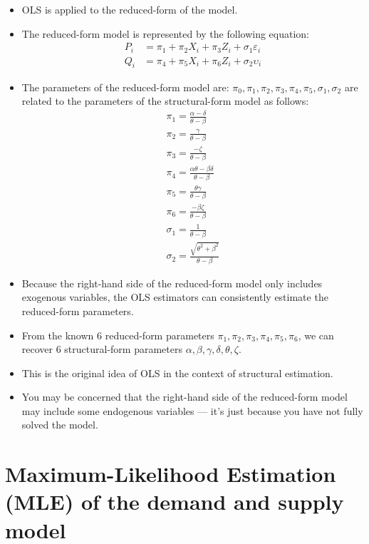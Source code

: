 \documentclass[
]{book}
\providecommand{\tightlist}{%
  \setlength{\itemsep}{0pt}\setlength{\parskip}{0pt}}
\begin{document}
\begin{itemize}
\tightlist
\item
  OLS is applied to the reduced-form of the model.
\item
  The reduced-form model is represented by the following equation:
  \begin{align}
    P_i &= \pi_1 + \pi_2 X_i + \pi_3 Z_i + \sigma_1 \varepsilon_i\\
    Q_i &= \pi_4 + \pi_5 X_i + \pi_6 Z_i + \sigma_2 \upsilon_i
  \end{align}
\item
  The parameters of the reduced-form model are: \(\pi_0, \pi_1, \pi_2, \pi_3, \pi_4, \pi_5, \sigma_1, \sigma_2\) are related to the parameters of the structural-form model as follows:
  \begin{align}
    \pi_1 = \frac{\alpha - \delta}{\theta - \beta} \\
    \pi_2 = \frac{\gamma}{\theta - \beta} \\
    \pi_3 = \frac{-\zeta}{\theta - \beta} \\
    \pi_4 = \frac{\alpha \theta - \beta \delta}{\theta - \beta} \\
    \pi_5 = \frac{\theta \gamma}{\theta - \beta} \\
    \pi_6 = \frac{- \beta \zeta}{\theta - \beta} \\
    \sigma_1 = \frac{1}{\theta - \beta} \\
    \sigma_2 = \frac{\sqrt{\theta^2 + \beta^2}}{\theta - \beta}
  \end{align}
\item
  Because the right-hand side of the reduced-form model only includes exogenous variables, the OLS estimators can consistently estimate the reduced-form parameters.
\item
  From the known 6 reduced-form parameters \(\pi_1, \pi_2, \pi_3, \pi_4, \pi_5, \pi_6\), we can recover 6 structural-form parameters \(\alpha, \beta, \gamma, \delta, \theta, \zeta\).
\item
  This is the original idea of OLS in the context of structural estimation.
\item
  You may be concerned that the right-hand side of the reduced-form model may include some endogenous variables --- it's just because you have not fully solved the model.
\end{itemize}

\hypertarget{maximum-likelihood-estimation-mle-of-the-demand-and-supply-model}{%
\section{Maximum-Likelihood Estimation (MLE) of the demand and supply model}\label{maximum-likelihood-estimation-mle-of-the-demand-and-supply-model}}
\end{document}
